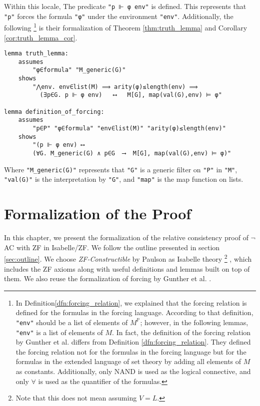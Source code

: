 \documentclass{report}
\newenvironment{isaframe}{\begin{mdframed}[topline=false, rightline=false, bottomline=false]}{\end{mdframed}}
\begin{document}
Within this locale, The predicate \texttt{"p ⊩ φ env"} is defined.
This represents that \texttt{"p"} forces the formula \texttt{"φ"} under the environment \texttt{"env"}.
Additionally, the following
\footnote{
In Definition\ref{dfn:forcing_relation},
we explained that the forcing relation is defined for the formulas in the forcing language.
According to that definition, \texttt{"env"} should be a list of elements of $M^{\mathbb{P}}$;
however, in the following lemmas, \texttt{"env"} is a list of elements of $M$.
In fact, the definition of the forcing relation by Gunther et al. differs from Definition \ref{dfn:forcing_relation}.
They defined the forcing relation not for the formulas in the forcing language 
but for the formulas in the extended language of set theory by adding all elements of $M$ as constants.
Additionally, only NAND is used as the logical connective, and only $\forall$ is used as the quantifier of the formulas.
} is their formalization of Theorem \ref{thm:truth_lemma} and Corollary \ref{cor:truth_lemma_cor}.
\begin{isaframe}
\begin{verbatim}
lemma truth_lemma:
    assumes 
        "φ∈formula" "M_generic(G)"
    shows 
        "⋀env. env∈list(M) ⟹ arity(φ)≤length(env) ⟹ 
          (∃p∈G. p ⊩ φ env)   ⟷   M[G], map(val(G),env) ⊨ φ"

lemma definition_of_forcing:
    assumes
        "p∈P" "φ∈formula" "env∈list(M)" "arity(φ)≤length(env)"
    shows
        "(p ⊩ φ env) ⟷
        (∀G. M_generic(G) ∧ p∈G  ⟶  M[G], map(val(G),env) ⊨ φ)"
\end{verbatim}
\end{isaframe}
Where \texttt{"M\_generic(G)"} represents that \texttt{"G"} is a generic filter on \texttt{"P"} in \texttt{"M"},
\texttt{"val(G)"} is the interpretation by \texttt{"G"},
and \texttt{"map"} is the map function on lists.

\chapter{Formalization of the Proof} 
In this chapter, we present the formalization of the relative consistency proof of $\neg$AC with ZF in Isabelle/ZF.
We follow the outline presented in section \ref{sec:outline}.
We choose \emph{ZF-Constructible} by Paulson \cite{paulson_AC_consistency} as Isabelle theory 
\footnote{Note that this does not mean assuming $V=L$.}
, which includes the ZF axioms along with useful definitions and lemmas built on top of them.
We also reuse the formalization of forcing by Gunther et al. \cite{gunther_forcing}.
\end{document}

